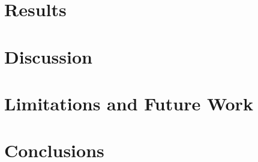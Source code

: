 \documentclass[11pt]{article}
\begin{document}
\section{Results}
\label{sec:results}

\newpage

\section{Discussion}
\label{sec:discussion}

\newpage

\section{Limitations and Future Work}
\label{sec:limitations}

\newpage

\section{Conclusions}
\label{sec:conclusions}

\newpage

{}
\begingroup
\raggedright


\endgroup
\newpage


\end{document}

